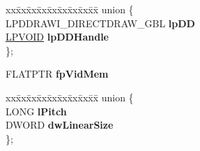 \begin{DoxyCompactItemize}
\begin{tabbing}
\end{tabbing}\item 
\mbox{\label{struct___d_d_r_a_w_i___d_d_r_a_w_s_u_r_f_a_c_e___g_b_l_a24f3b39916e3379b616741142e894807}} 
\begin{tabbing}
xx\=xx\=xx\=xx\=xx\=xx\=xx\=xx\=xx\=\kill
union \{\\
\>LPDDRAWI\_DIRECTDRAW\_GBL {\bfseries lpDD}\\
\>\hyperlink{interfacevoid}{LPVOID} {\bfseries lpDDHandle}\\
\}; \\

\end{tabbing}\item 
\mbox{\label{struct___d_d_r_a_w_i___d_d_r_a_w_s_u_r_f_a_c_e___g_b_l_a5813db92716d97d52cd37f23dfa40dc7}} 
F\+L\+A\+T\+P\+TR {\bfseries fp\+Vid\+Mem}
\item 
\mbox{\label{struct___d_d_r_a_w_i___d_d_r_a_w_s_u_r_f_a_c_e___g_b_l_aa5d6fada318c6c4c5feb4b1587b9e3c8}} 
\begin{tabbing}
xx\=xx\=xx\=xx\=xx\=xx\=xx\=xx\=xx\=\kill
union \{\\
\>LONG {\bfseries lPitch}\\
\>DWORD {\bfseries dwLinearSize}\\
\}; \\


\end{tabbing}
\end{DoxyCompactItemize}
